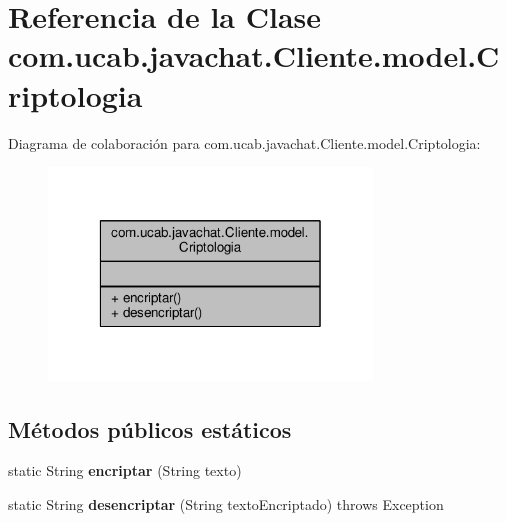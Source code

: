 \hypertarget{classcom_1_1ucab_1_1javachat_1_1_cliente_1_1model_1_1_criptologia}{\section{Referencia de la Clase com.\-ucab.\-javachat.\-Cliente.\-model.\-Criptologia}
\label{classcom_1_1ucab_1_1javachat_1_1_cliente_1_1model_1_1_criptologia}
}


Diagrama de colaboración para com.\-ucab.\-javachat.\-Cliente.\-model.\-Criptologia\-:
\nopagebreak
\begin{figure}[H]
\begin{center}
\leavevmode
\includegraphics[width=244pt]{d5/d30/classcom_1_1ucab_1_1javachat_1_1_cliente_1_1model_1_1_criptologia__coll__graph}
\end{center}
\end{figure}
\subsection*{Métodos públicos estáticos}
\begin{DoxyCompactItemize}
\item 
\hypertarget{classcom_1_1ucab_1_1javachat_1_1_cliente_1_1model_1_1_criptologia_ae1dd0633e8f03d5a9ca3738ea7073275}{static String {\bfseries encriptar} (String texto)}\label{classcom_1_1ucab_1_1javachat_1_1_cliente_1_1model_1_1_criptologia_ae1dd0633e8f03d5a9ca3738ea7073275}

\item 
\hypertarget{classcom_1_1ucab_1_1javachat_1_1_cliente_1_1model_1_1_criptologia_a00407379cf4e57988ad22d24d3e58505}{static String {\bfseries desencriptar} (String texto\-Encriptado)  throws Exception }\label{classcom_1_1ucab_1_1javachat_1_1_cliente_1_1model_1_1_criptologia_a00407379cf4e57988ad22d24d3e58505}

\end{DoxyCompactItemize}


